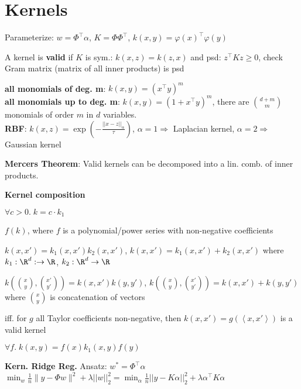 \section*{Kernels}

Parameterize: $w = \Phi^\top \alpha$, $K = \Phi \Phi^\top$, $k(x,y) = \varphi(x)^\top \varphi(y)$

A kernel is \textbf{valid} if $K$ is sym.: $k(x,z) = k(z,x)$ and psd: $z^\top K z \geq 0$, check Gram matrix (matrix of all inner products) is psd

\textbf{all monomials of deg. m}: $k(x,y) = (x^\top y)^m$ \\
\textbf{all monomials up to deg. m}: $k(x,y) = (1+x^\top y)^m$, there are $\binom{d+m}{m}$ monomials of 
order $m$ in $d$ variables.\\

\textbf{RBF}: $k(x, z) = \exp ( -\frac{||x - z||_\alpha}{\tau} )$, $\alpha = 1 \Rightarrow $ Laplacian kernel, $\alpha = 2 \Rightarrow $ Gaussian kernel

\textbf{Mercers Theorem}: Valid kernels can be decomposed into a lin. comb. of inner products.

\textbf{Kernel composition}

\begin{rowlist}
    \item $\forall c > 0. \; k = c \cdot k_1$
    \item $f(k)$, where $f$ is a polynomial/power series with non-negative coefficients
    \item{
        $k(x, x') = k_1(x, x')k_2(x, x')$, $k(x, x') = k_1(x, x') + k_2(x, x')$ where $ k_1: \R^d : \rightarrow \R$, $k_2: \R^d \rightarrow \R $
    }
    \item{
        $k(\binom{x}{y}, \binom{x'}{y'})=k(x,x')k(y,y')$, $k(\binom{x}{y}, \binom{x'}{y'})=k(x,x') + k(y,y')$ where $\binom{x}{y}$ is concatenation of vectors
    }
    \item iff. for $g$ all Taylor coefficients non-negative, then $k(x, x') = g(\left< x, x' \right>)$ is a valid kernel
    \item $\forall f. \; k(x,y) = f(x)k_1(x,y)f(y)$
\end{rowlist}

\textbf{Kern. Ridge Reg.}
Ansatz: $w^*=\Phi^\top\alpha$\\
$\min_w \frac1n \|y - \Phi w\|^2 + \lambda ||w||_2^2 = \min_\alpha \frac1n ||y - K\alpha||_2^2 + \lambda \alpha^\top K \alpha$
